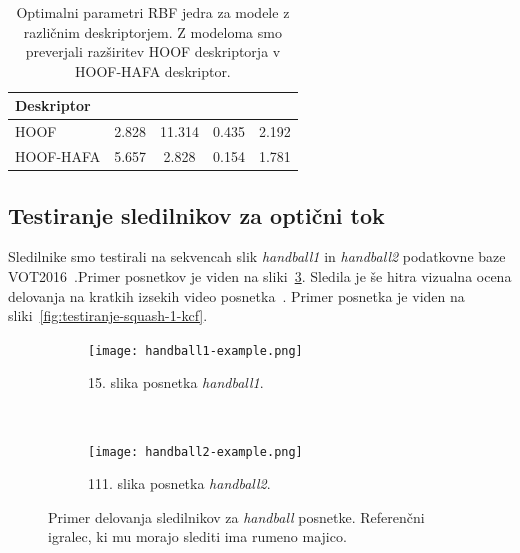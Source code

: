 \begin{table}[htb]
	\centering
	\begin{tabular}{l S[table-format=2.3] S[table-format=1.3] S[table-format=1.3] S[table-format=1.3]}
		\toprule
		\textbf{Deskriptor} &  & \theadm{\gamma} & \theadm{\epsilon} &  \\
		\midrule
		HOOF & 2.828 & 11.314 & 0.435 & 2.192 \\
		HOOF-HAFA & 5.657 & 2.828 & 0.154 & 1.781 \\
		\bottomrule
	\end{tabular}
	\caption[Optimalni parameteri RBF jedra modelov za izbiro deskriptorjev]{Optimalni parametri RBF jedra za modele z različnim deskriptorjem. Z modeloma smo preverjali razširitev HOOF deskriptorja v HOOF-HAFA deskriptor.}
	\label{tab:izbira-param}
\end{table}














\subsection{Testiranje sledilnikov za optični tok}\label{sec:testiranje-sledilnikov-za-opticni-tok}
Sledilnike smo testirali na sekvencah slik \textit{handball1} in \textit{handball2} podatkovne baze VOT2016~\cite{kristan2016visual}.Primer posnetkov je viden na sliki~\ref{fig:testiranje-tracker-visual}. Sledila je še hitra vizualna ocena delovanja na kratkih izsekih video posnetka~\cite{squashtv2014squash}. Primer posnetka je viden na sliki~\ref{fig:testiranje-squash-1-kcf}.

\begin{figure}[!htbp]
	\centering
	
	\begin{subfigure}[t]{0.45\columnwidth}
		\texttt{[image: handball1-example.png]}
		\caption{15. slika posnetka \textit{handball1}.}
		\label{fig:testiranje-handball1}
	\end{subfigure}
	~
	\begin{subfigure}[t]{0.45\columnwidth}
		\texttt{[image: handball2-example.png]}
		\caption{111. slika posnetka \textit{handball2}.}
		\label{fig:testiranje-handball2}
	\end{subfigure}  
	\caption[Primer delovanja sledilnikov za \textit{handball} posnetke]{Primer delovanja sledilnikov za \textit{handball} posnetke. Referenčni igralec, ki mu morajo slediti ima rumeno majico. }
	\label{fig:testiranje-tracker-visual}
\end{figure}



